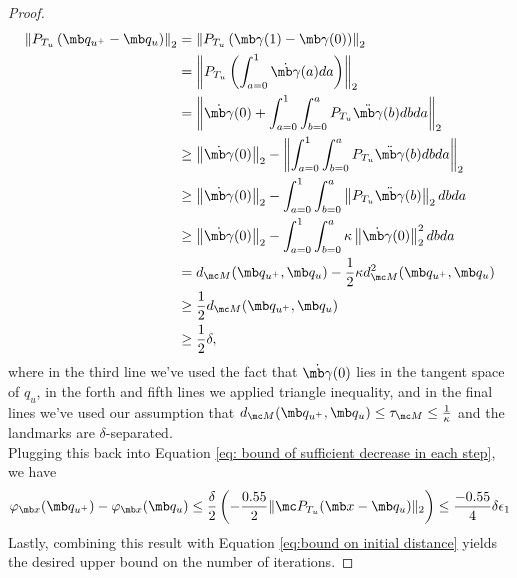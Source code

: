 \begin{proof}
\begin{equation}\label{eq: bound norm of edge embedding}
    \begin{aligned}
        \left\|P_{T_u}\left(\mb q_{u^+}-\mb q_u\right)\right\|_2
        &= \left\|
        P_{T_u}\left(\mb\gamma(1)-\mb\gamma(0)
        \right)\right\|_2\\
        &= \left\|
        P_{T_u}\left(\int_{a=0}^1 \Dot{\mb\gamma}(a)da
        \right)\right\|_2\\
        &= \left\|\Dot{\mb\gamma}(0) + \int_{a=0}^1 \int_{b=0}^a P_{T_u}\Ddot{\mb\gamma}(b) db da\right\|_2\\
        &\geq \left\|\Dot{\mb\gamma}(0)\right\|_2 - \left\|\int_{a=0}^1 \int_{b=0}^a P_{T_u}\Ddot{\mb\gamma}(b) db da\right\|_2\\
        &\geq \left\|\Dot{\mb\gamma}(0)\right\|_2 - \int_{a=0}^1 \int_{b=0}^a \left\|P_{T_u}\Ddot{\mb\gamma}(b)\right\|_2 db da\\
        &\geq \left\|\Dot{\mb\gamma}(0)\right\|_2 - \int_{a=0}^1 \int_{b=0}^a \kappa \left\|\Dot{\mb\gamma}(0)\right\|_2^2 db da\\
        &= d_{\mc M}(\mb q_{u^+}, \mb q_u) - \frac{1}{2}\kappa d_{\mc M}^2(\mb q_{u^+}, \mb q_u)\\
        &\geq \frac{1}{2} d_{\mc M}(\mb q_{u^+}, \mb q_u)\\
        &\geq \frac{1}{2} \delta,
    \end{aligned}
\end{equation}
where in the third line we've used the fact that $\Dot{\mb\gamma}(0)$ lies in the tangent space of $q_u$, in the forth and fifth lines we applied triangle inequality, and in the final lines we've used our assumption that $d_{\mc M}(\mb q_{u^+}, \mb q_u) \leq \tau_{\mc M} \le \frac{1}{\kappa}$ and the landmarks are $\delta$-separated.\\
\vspace{0.2in}
Plugging this back into Equation \eqref{eq: bound of sufficient decrease in each step}, we have 
\begin{equation}
        \varphi_{\mb x}(\mb q_{u^+}) - \varphi_{\mb x}(\mb q_u) \le \frac{\delta}{2} \left(-\frac{0.55}{2}\| \mc P_{T_u}(\mb x - \mb q_u) \|_2 \right) \le \frac{-0.55}{4}\delta\epsilon_1
\end{equation}
Lastly, combining this result with Equation \eqref{eq:bound on initial distance} yields the desired upper bound on the number of iterations.


\end{proof}

